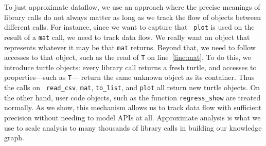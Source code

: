 To just approximate dataflow, we use an approach where 
the precise meanings of library calls do
not always matter as long as we track the flow of objects between
different calls.  For instance, since we want to capture that {\tt
plot} is used on the result of a {\tt mat} call, we need to track
data flow.  We really want an object that represents whatever it may
be that {\tt mat} returns.  Beyond that, we need to follow accesses to
that object, such as the read of {\tt T} on line~\ref{line:mat}.  To
do this, we introduce turtle objects: every library call returns a fresh
turtle, and accesses to properties---such as {\tt T}--- return the
same unknown object as its container.  Thus the calls on {\tt
  read\_csv}, {\tt mat}, {\tt to\_list}, and {\tt plot} all return new
turtle objects.  On the other hand, user code objects, such as the
function {\tt regress\_show} are treated normally.  As we show, this
mechanism allows us to track data flow with sufficient precision
without needing to model APIs at all.  Approximate analysis is what we use to scale analysis to many thousands of library calls in building our knowledge graph.
